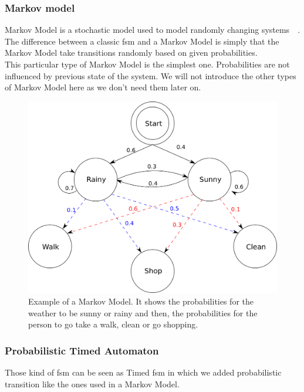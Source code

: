 \documentclass[12pt]{article}
\theoremstyle{definition}
\theoremstyle{definition}
\begin{document}
\subsubsection{Markov model}

Markov Model is a stochastic model used to model randomly changing systems~\cite{1165342}~\cite{MarkovModel:2017}. The difference between a classic \gls{fsm} and a Markov Model is simply that the Markov Model take transitions randomly based on given probabilities.\\

This particular type of Markov Model is the simplest one. Probabilities are not influenced by previous state of the system. We will not introduce the other types of Markov Model here as we don't need them later on.

\begin{figure}
    \centering
    \includegraphics[scale=0.3]{MarkovModel.png}
    \caption{Example of a Markov Model. It shows the probabilities for the weather to be sunny or rainy and then, the probabilities for the person to go take a walk, clean or go shopping.}
    \label{MarkovModel}
\end{figure}

\subsubsection{Probabilistic Timed Automaton}

Those kind of \gls{fsm} can be seen as Timed \gls{fsm} in which we added probabilistic transition like the ones used in a Markov Model.
\end{document}
